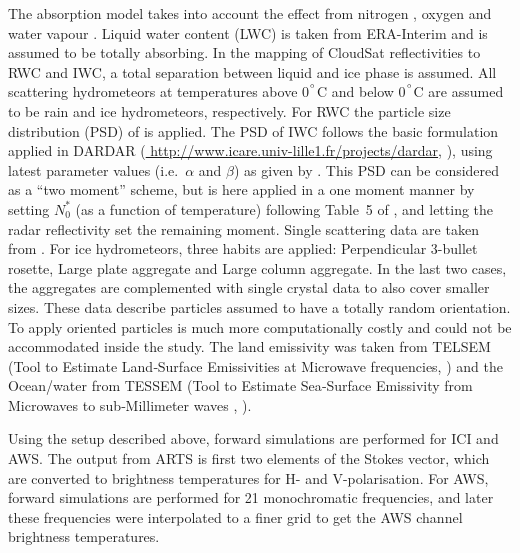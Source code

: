 \documentclass[amt, manuscript]{copernicus}
\begin{document}
The absorption model takes into account the effect from nitrogen
\citep{pwr:93}, oxygen \citep{pwr:93} and water vapour  \citep{ellison2007permittivity}. Liquid water content (LWC) is taken from ERA-Interim  and is assumed to be totally absorbing. In the mapping of CloudSat reflectivities to RWC and IWC, a total separation between liquid and ice phase is assumed. All scattering hydrometeors at temperatures above 0$^{^{\circ}}$C and below 0$^{^{\circ}}$C are assumed to be rain and ice hydrometeors, respectively. For RWC the particle size
distribution (PSD) of \citet{abel2012improved} is applied. The PSD of IWC follows the basic formulation applied in DARDAR (\url{
http://www.icare.univ-lille1.fr/projects/dardar}, \citet{delanoe2008variational}), using latest parameter
values (i.e.\ $\alpha$ and $\beta$) as given by \citet{cazenave2019evolution}.
This PSD can be considered as a ``two moment'' scheme, but is here applied in
a one moment manner by setting $N_0^*$ (as a function of temperature)
following Table~5 of \citet{delanoe2014normalized}, and letting the radar
reflectivity set the remaining moment. Single scattering data are taken from
\citet{eriksson:agene:18}. For ice hydrometeors, three habits are applied:
Perpendicular 3-bullet rosette, Large plate aggregate and Large column
aggregate. In the last two cases, the aggregates are complemented with single
crystal data to also cover smaller sizes. These data describe particles
assumed to have a totally random orientation. To apply oriented particles is
much more computationally costly and could not be accommodated inside the
study. The land emissivity was taken from TELSEM (Tool to Estimate Land‐Surface Emissivities at Microwave frequencies, \citet{aires2011tool}) and the
Ocean/water from TESSEM (Tool to Estimate Sea‐Surface Emissivity from Microwaves to sub‐Millimeter waves , \citet{prigent2017sea}).

Using the setup described above,  forward simulations are performed for ICI and AWS. The output from ARTS is first two elements of the Stokes vector,  which are converted to brightness temperatures for H- and V-polarisation. For AWS, forward simulations are performed for 21 monochromatic frequencies, and later these frequencies were interpolated to a finer grid to get the AWS channel brightness temperatures.
\end{document}
